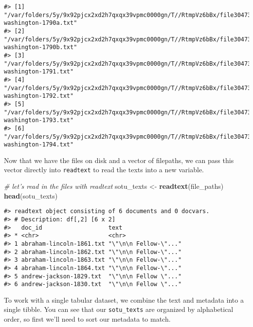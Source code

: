 \documentclass[]{book}
\newenvironment{Shaded}{\begin{snugshade}}{\end{snugshade}}
\newcommand{\CommentTok}[1]{\textcolor[rgb]{0.56,0.35,0.01}{\textit{#1}}}
\newcommand{\KeywordTok}[1]{\textcolor[rgb]{0.13,0.29,0.53}{\textbf{#1}}}
\newcommand{\NormalTok}[1]{#1}
\newcommand{\OperatorTok}[1]{\textcolor[rgb]{0.81,0.36,0.00}{\textbf{#1}}}
\newcommand{\StringTok}[1]{\textcolor[rgb]{0.31,0.60,0.02}{#1}}
\begin{document}
\begin{verbatim}
#> [1] "/var/folders/5y/9x92pjcx2xd2h7qxqx39vpmc0000gn/T//RtmpVz6bBx/file304733ab7d52/george-washington-1790a.txt"
#> [2] "/var/folders/5y/9x92pjcx2xd2h7qxqx39vpmc0000gn/T//RtmpVz6bBx/file304733ab7d52/george-washington-1790b.txt"
#> [3] "/var/folders/5y/9x92pjcx2xd2h7qxqx39vpmc0000gn/T//RtmpVz6bBx/file304733ab7d52/george-washington-1791.txt" 
#> [4] "/var/folders/5y/9x92pjcx2xd2h7qxqx39vpmc0000gn/T//RtmpVz6bBx/file304733ab7d52/george-washington-1792.txt" 
#> [5] "/var/folders/5y/9x92pjcx2xd2h7qxqx39vpmc0000gn/T//RtmpVz6bBx/file304733ab7d52/george-washington-1793.txt" 
#> [6] "/var/folders/5y/9x92pjcx2xd2h7qxqx39vpmc0000gn/T//RtmpVz6bBx/file304733ab7d52/george-washington-1794.txt"
\end{verbatim}

Now that we have the files on disk and a vector of filepaths, we can pass this vector directly into \texttt{readtext} to read the texts into a new variable.

\begin{Shaded}
\begin{Highlighting}[]
\CommentTok{# let's read in the files with readtext}
\NormalTok{sotu_texts <-}\StringTok{ }\KeywordTok{readtext}\NormalTok{(file_paths)}
\KeywordTok{head}\NormalTok{(sotu_texts)}
\end{Highlighting}
\end{Shaded}

\begin{verbatim}
#> readtext object consisting of 6 documents and 0 docvars.
#> # Description: df[,2] [6 x 2]
#>   doc_id                   text                 
#> * <chr>                    <chr>                
#> 1 abraham-lincoln-1861.txt "\"\n\n Fellow-\"..."
#> 2 abraham-lincoln-1862.txt "\"\n\n Fellow-\"..."
#> 3 abraham-lincoln-1863.txt "\"\n\n Fellow-\"..."
#> 4 abraham-lincoln-1864.txt "\"\n\n Fellow-\"..."
#> 5 andrew-jackson-1829.txt  "\"\n\n Fellow \"..."
#> 6 andrew-jackson-1830.txt  "\"\n\n Fellow \"..."
\end{verbatim}

To work with a single tabular dataset, we combine the text and metadata into a single tibble. You can see that our \texttt{sotu\_texts} are organized by alphabetical order, so first we'll need to sort our metadata to match.

\begin{Shaded}
\end{Shaded}
\end{document}
